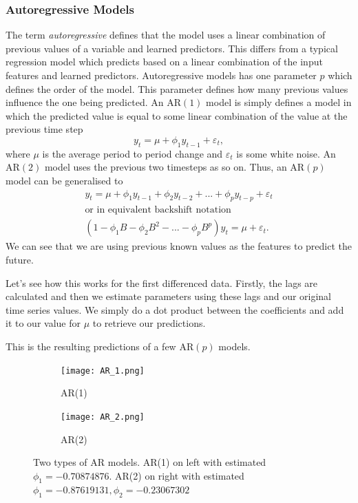 \documentclass{article}
\begin{document}
  \subsubsection{Autoregressive Models}
    The term \emph{autoregressive} defines that the model uses a linear combination of previous values of a variable and learned predictors. This differs from a typical regression model which predicts based on a linear combination of the input features and learned predictors.
    Autoregressive models has one parameter $p$ which defines the order of the model. This parameter defines how many previous values influence the one being predicted. 
    An AR$(1)$ model is simply defines a model in which the predicted value is equal to some linear combination of the value at the previous time step
    \begin{equation*}
      y_t = \mu + \phi_1 y_{t-1} + \varepsilon_t,
    \end{equation*}
    where $\mu$ is the average period to period change and $\varepsilon_t$ is some white noise.
    An AR$(2)$ model uses the previous two timesteps as so on.
    Thus, an AR$(p)$ model can be generalised to
    \begin{gather*}
      y_t = \mu + \phi_1 y_{t-1} + \phi_2 y_{t-2} + ... + \phi_p y_{t-p} + \varepsilon_t\\
      \text{or in equivalent backshift notation}\\
      (1 - \phi_1B - \phi_2B^2 - ... - \phi_pB^p)y_t = \mu + \varepsilon_t.
    \end{gather*}
    We can see that we are using previous known values as the features to predict the future.

    Let's see how this works for the first differenced data. Firstly, the lags are calculated and then we estimate parameters using these lags and our original time series values. We simply do a dot product between the coefficients and add it to our value for $\mu$ to retrieve our predictions. 
    
    This is the resulting predictions of a few AR$(p)$ models.

    \begin{figure}[H]
      \centering
      \captionsetup{justification=centering}
      \begin{subfigure}[b]{0.49\linewidth}
        \texttt{[image: AR\_1.png]}
        \caption{AR(1)}
      \end{subfigure}
      \begin{subfigure}[b]{0.49\linewidth}
        \texttt{[image: AR\_2.png]}
        \caption{AR(2)}
      \end{subfigure}
      \caption{Two types of AR models. AR(1) on left with estimated $\phi_1 = -0.70874876$. AR(2) on right with estimated $\phi_1 = -0.87619131, \phi_2 = -0.23067302$}
    \end{figure}
\end{document}

